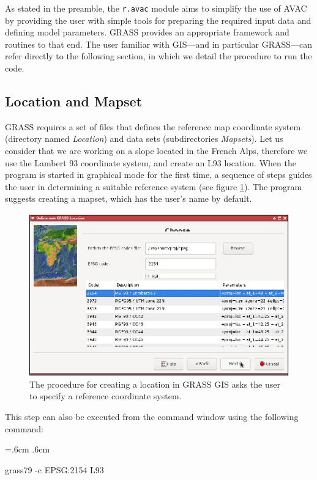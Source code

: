 \documentclass[12pt,oneside]{paper}
\newenvironment{code}{%
\vspace{2mm}%
\hangindent=.6cm%
\parindent.6cm%
\ttfamily%
\color{gris.3}%
}{
\vspace{2mm}%
}
\begin{document}
As stated in the preamble,  the \verb+r.avac+ module aims to simplify the use of AVAC by providing the user with simple tools for preparing the required input data and defining model parameters. GRASS provides an appropriate framework and routines to that end. The user familiar with GIS---and in particular GRASS---can refer directly to the following section, in which we detail the procedure to run the code.

\subsection{Location and Mapset}

GRASS requires a set of files that defines the reference map coordinate system (directory named \emph{Location}) and data sets (subdirectories \emph{Mapsets}). Let us consider that we are working on a slope located in the French Alps, therefore we use the Lambert 93 coordinate system, and create an L93 location. When the program is started in graphical mode for the first time, a sequence of steps guides the user in determining a suitable reference system (see figure \ref{fig:location}). The program suggests creating a mapset, which has the user's name by default.


\begin{figure}[!h]
\begin{center}
\includegraphics[width=0.70\hsize]{capture0.eps}
\caption{The procedure for creating a location in GRASS GIS asks the user to specify a reference coordinate system.}
\label{fig:location}
\end{center}
\end{figure}

This step can also be executed from the command window using the following command:

\begin{code}
grass79 -c EPSG:2154 L93
\end{code}
\end{document}
